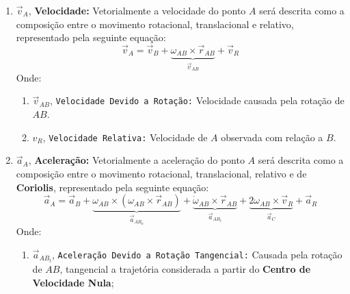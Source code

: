 \documentclass{article}
\begin{document}
\begin{enumerate}[rightmargin = \leftmargin]
                    \item $\vec{v}_{A}$, \textbf{Velocidade:} Vetorialmente a velocidade do ponto $A$ será descrita como a composição entre o movimento rotacional,  translacional e relativo, representado pela seguinte equação:
                        \begin{equation}
                            \boxed{
                                \vec{v}_{A} = 
                                \vec{v}_{B} + 
                                \underbrace{
                                    \omega_{AB}\times\vec{r}_{AB}
                                }_{\vec{v}_{AB}} + 
                                \vec{v}_{R}
                            }
                        \end{equation}
                    Onde:
                        \begin{enumerate}[rightmargin = \leftmargin, noitemsep]
                            \item $\vec{v}_{AB}$, \texttt{Velocidade Devido a Rotação:} Velocidade causada pela rotação de $AB$.

                            \item $v_{R}$, \texttt{Velocidade Relativa:} Velocidade de $A$ observada com relação a $B$.
                        \end{enumerate}

                    \item $\vec{a}_{A}$, \textbf{Aceleração:} Vetorialmente a aceleração do ponto $A$ será descrita como a composição entre o movimento rotacional, translacional, relativo e de \textbf{Coriolis}, representado pela seguinte equação:
                        \begin{equation}
                            \boxed{
                                \vec{a}_{A} = 
                                \vec{a}_{B} + 
                                \underbrace{
                                    \omega_{AB}\times(\omega_{AB}\times\vec{r}_{AB})
                                }_{\vec{a}_{AB_{n}}} + 
                                \underbrace{
                                    \dot{\omega}_{AB}\times\vec{r}_{AB}
                                }_{\vec{a}_{AB_{t}}} + 
                                \underbrace{
                                    2\omega_{AB}\times\vec{v}_{R}
                                }_{\vec{a}_{C}} + 
                                \vec{a}_{R}
                            }
                        \end{equation}
                    Onde:
                        \begin{enumerate}[rightmargin = \leftmargin]
                            \item $\vec{a}_{AB_{t}}$, \texttt{Aceleração Devido a Rotação Tangencial:} Causada pela rotação de $AB$, tangencial a trajetória considerada a partir do \textbf{Centro de Velocidade Nula};


\end{enumerate}
\end{enumerate}
\end{document}
